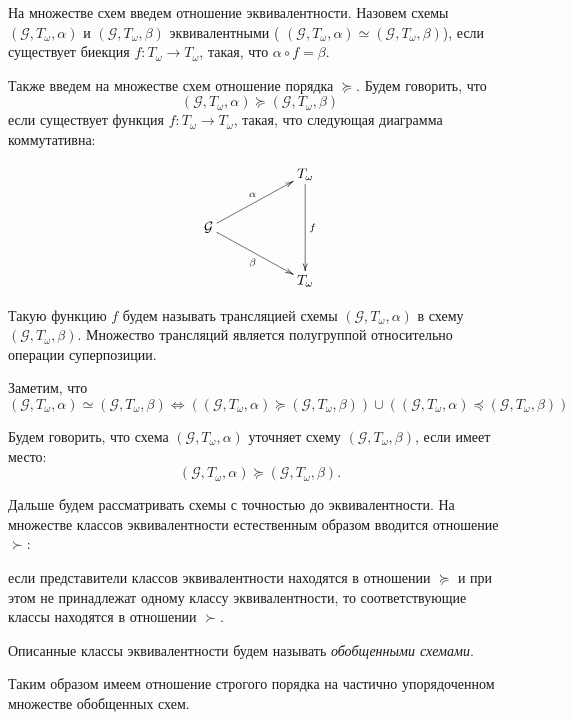 \documentclass[a4paper,12pt]{article}
\begin{document}
На множестве схем введем отношение эквивалентности. Назовем схемы $(\mathcal{G}, T_{\omega}, \alpha) $ и  $(\mathcal{G}, T_{\omega}, \beta) $ эквивалентными ( $(\mathcal{G}, T_{\omega}, \alpha) \simeq (\mathcal{G}, T_{\omega}, \beta) $), если существует биекция $f:   T_{\omega} \rightarrow T_{\omega} $, такая, что 
$ \alpha \circ f = \beta $.

Также введем на множестве схем отношение порядка $\succcurlyeq$. Будем говорить, что 
  $$(\mathcal{G}, T_{\omega}, \alpha)\succcurlyeq (\mathcal{G}, T_{\omega}, \beta) $$
 если существует функция $f:   T_{\omega} \rightarrow T_{\omega} $, такая, что следующая диаграмма коммутативна:


\begin{displaymath}
    \xymatrix{
                            &      &  T_{\omega} \ar[dd]^{f} \\
        {\mathcal{G}} \ar[rru]^{\alpha} \ar[rrd]_{\beta}&      &               \\
                            &       & T_{\omega}  }
\end{displaymath}

Такую функцию $f$ будем называть трансляцией схемы $(\mathcal{G}, T_{\omega}, \alpha) $ в схему $(\mathcal{G}, T_{\omega}, \beta) $. Множество трансляций является полугруппой относительно операции суперпозиции.

Заметим, что 
$$(\mathcal{G}, T_{\omega}, \alpha) \simeq (\mathcal{G}, T_{\omega}, \beta) \iff ((\mathcal{G}, T_{\omega}, \alpha)\succcurlyeq (\mathcal{G}, T_{\omega}, \beta))\cup ((\mathcal{G}, T_{\omega}, \alpha)\preccurlyeq (\mathcal{G}, T_{\omega}, \beta))   $$ 

 Будем говорить, что схема $(\mathcal{G}, T_{\omega}, \alpha)$ уточняет схему $(\mathcal{G}, T_{\omega}, \beta)$, если
 имеет место:
$$(\mathcal{G}, T_{\omega}, \alpha)\succcurlyeq (\mathcal{G}, T_{\omega}, \beta). $$

Дальше будем рассматривать схемы с точностью до эквивалентности. На множестве классов эквивалентности естественным
образом вводится отношение $\succ$:

 если представители классов эквивалентности находятся в отношении $\succcurlyeq$ и при этом не принадлежат одному классу эквивалентности, то соответствующие классы находятся в отношении $\succ$. 

Описанные классы эквивалентности будем называть {\it обобщенными схемами}.

Таким образом имеем отношение строгого порядка на частично упорядоченном множестве обобщенных схем.
\end{document}
